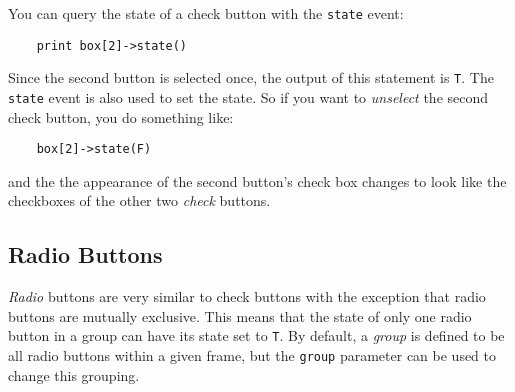 You can query the state of a check button with the {\tt state} event:
\begin{verbatim}
    print box[2]->state()
\end{verbatim}
Since the second button is selected once, the output of this
statement is {\tt T}. The {\tt state} event is also  used to set the
state. So if you  want to {\em unselect} the second check button, you do 
something like:
\begin{verbatim}
    box[2]->state(F)
\end{verbatim}
and the the appearance of the second button's check box changes to look like
the checkboxes of the other two {\em check} buttons.

\subsection{Radio Buttons}
{\em Radio} buttons are very similar to check buttons with the exception that
radio buttons are mutually exclusive. This means that the state of only one
radio button in a group can have its state set to {\tt T}. By default, a {\em group}
is defined to be all radio buttons within a given frame, but the {\tt group} parameter
can be used to change this grouping. 

